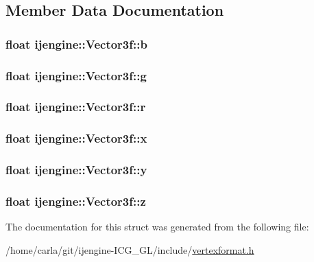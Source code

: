 \subsection{Member Data Documentation}
\hypertarget{structijengine_1_1Vector3f_a7e2ca78b9123dbfc1f2062e2bb8cb080}{
\subsubsection[{b}]{\setlength{\rightskip}{0pt plus 5cm}float ijengine\-::\-Vector3f\-::b}}\label{structijengine_1_1Vector3f_a7e2ca78b9123dbfc1f2062e2bb8cb080}
\hypertarget{structijengine_1_1Vector3f_aed60781da1bd07f723e3afe4136bc0ce}{
\subsubsection[{g}]{\setlength{\rightskip}{0pt plus 5cm}float ijengine\-::\-Vector3f\-::g}}\label{structijengine_1_1Vector3f_aed60781da1bd07f723e3afe4136bc0ce}
\hypertarget{structijengine_1_1Vector3f_a0e7ca8f82170904af1d5132671e744b6}{
\subsubsection[{r}]{\setlength{\rightskip}{0pt plus 5cm}float ijengine\-::\-Vector3f\-::r}}\label{structijengine_1_1Vector3f_a0e7ca8f82170904af1d5132671e744b6}
\hypertarget{structijengine_1_1Vector3f_a62f586236d9e15cd6c95d354138f4362}{
\subsubsection[{x}]{\setlength{\rightskip}{0pt plus 5cm}float ijengine\-::\-Vector3f\-::x}}\label{structijengine_1_1Vector3f_a62f586236d9e15cd6c95d354138f4362}
\hypertarget{structijengine_1_1Vector3f_a92ab51702f08a8dd02f7b5eecac5d16f}{
\subsubsection[{y}]{\setlength{\rightskip}{0pt plus 5cm}float ijengine\-::\-Vector3f\-::y}}\label{structijengine_1_1Vector3f_a92ab51702f08a8dd02f7b5eecac5d16f}
\hypertarget{structijengine_1_1Vector3f_a79837bed7b540c2f5191ccb841e97b32}{
\subsubsection[{z}]{\setlength{\rightskip}{0pt plus 5cm}float ijengine\-::\-Vector3f\-::z}}\label{structijengine_1_1Vector3f_a79837bed7b540c2f5191ccb841e97b32}


The documentation for this struct was generated from the following file\-:\begin{DoxyCompactItemize}
\item 
/home/carla/git/ijengine-\/\-I\-C\-G\-\_\-\-G\-L/include/\hyperlink{vertexformat_8h}{vertexformat.\-h}\end{DoxyCompactItemize}
